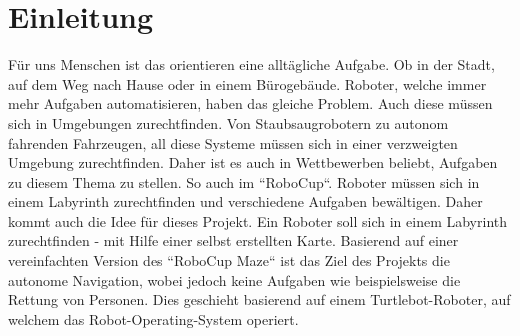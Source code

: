 \section{Einleitung}
{
	Für uns Menschen ist das orientieren eine alltägliche Aufgabe. Ob in der Stadt, auf dem Weg nach Hause oder in einem Bürogebäude. Roboter, welche immer mehr Aufgaben automatisieren, haben das gleiche Problem. Auch diese müssen sich in Umgebungen zurechtfinden. Von Staubsaugrobotern zu autonom fahrenden Fahrzeugen, all diese Systeme müssen sich in einer verzweigten Umgebung zurechtfinden. Daher ist es auch in Wettbewerben beliebt, Aufgaben zu diesem Thema zu stellen. So auch im ``RoboCup``. Roboter müssen sich in einem Labyrinth zurechtfinden und verschiedene Aufgaben bewältigen. Daher kommt auch die Idee für dieses Projekt. Ein Roboter soll sich in einem Labyrinth zurechtfinden - mit Hilfe einer selbst erstellten Karte. Basierend auf einer vereinfachten Version des ``RoboCup Maze`` ist das Ziel des Projekts die autonome Navigation, wobei jedoch keine Aufgaben wie beispielsweise die Rettung von Personen. Dies geschieht basierend auf einem Turtlebot-Roboter, auf welchem das Robot-Operating-System operiert.
}